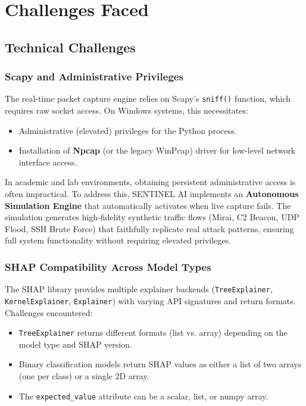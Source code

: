 \chapter{Challenges Faced}

\section{Technical Challenges}

\subsection{Scapy and Administrative Privileges}

The real-time packet capture engine relies on Scapy's \texttt{sniff()} function, which requires raw socket access. On Windows systems, this necessitates:
\begin{itemize}
    \item Administrative (elevated) privileges for the Python process.
    \item Installation of \textbf{Npcap} (or the legacy WinPcap) driver for low-level network interface access.
\end{itemize}

In academic and lab environments, obtaining persistent administrative access is often impractical. To address this, SENTINEL AI implements an \textbf{Autonomous Simulation Engine} that automatically activates when live capture fails. The simulation generates high-fidelity synthetic traffic flows (Mirai, C2 Beacon, UDP Flood, SSH Brute Force) that faithfully replicate real attack patterns, ensuring full system functionality without requiring elevated privileges.

\subsection{SHAP Compatibility Across Model Types}

The SHAP library provides multiple explainer backends (\texttt{TreeExplainer}, \texttt{KernelExplainer}, \texttt{Explainer}) with varying API signatures and return formats. Challenges encountered:
\begin{itemize}
    \item \texttt{TreeExplainer} returns different formats (list vs. array) depending on the model type and SHAP version.
    \item Binary classification models return SHAP values as either a list of two arrays (one per class) or a single 2D array.
    \item The \texttt{expected\_value} attribute can be a scalar, list, or numpy array.
\end{itemize}

